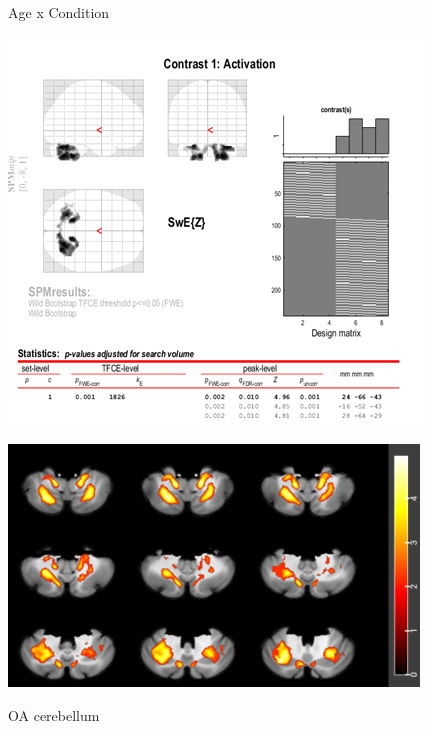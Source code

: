 \documentclass[a4paper,fleqn]{cas-sc}
\begin{document}
\begin{figure}[ht]
\begin{minipage}{0.48\textwidth}
         \label{fig:b}
    \end{minipage}
    \caption{Age x Condition}
    \label{fig:AgexCon_Slice}
\end{figure}




\begin{figure}[ht]
    \centering
    \begin{minipage}{0.48\textwidth}
        \centering
        \includegraphics[clip, trim=0 0 0 0, width=\linewidth]{figs/OAcereb_spm.png} %
         \label{fig:a}
    \end{minipage}
    \begin{minipage}{0.48\textwidth}
        \centering
        \includegraphics[clip, trim=0 0 0 0, width=\linewidth]{figs/OAcereb_slice.png} %
         \label{fig:b}
    \end{minipage}
    \caption{OA cerebellum}
    \label{fig:OAcereb_slice}
\end{figure}
\end{document}
